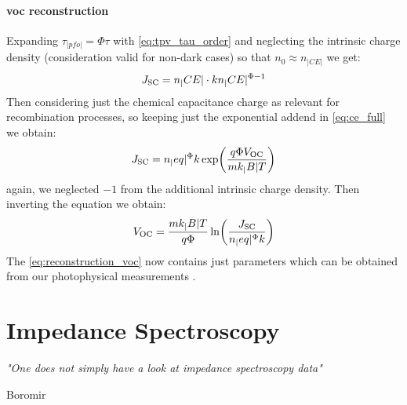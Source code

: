 	\paragraph{\Gls{voc} reconstruction}
	Expanding $\tau_|pfo| = \Phi \tau$ with \cref{eq:tpv_tau_order} and neglecting the intrinsic charge density (consideration valid for non-dark cases) so that $n_0 \approx n_|CE|$ we get:
	\begin{equation}
		J_\mathrm{SC} = n_|CE| \cdot k n_|CE|^{\Phi-1}
	\end{equation}
	Then considering just the chemical capacitance charge as relevant for recombination processes, so keeping just the exponential addend in \cref{eq:ce_full} we obtain:
	\begin{equation}
		J_\mathrm{SC} = n_|eq|^\Phi k \exp(\frac{q \Phi V_\mathrm{OC}}{m k_|B| T})
	\end{equation}
	again, we neglected $-1$ from the additional intrinsic charge density. Then inverting the equation we obtain:
	\begin{equation}\label{eq:reconstruction_voc}
		V_\mathrm{OC} = \frac{m k_|B| T}{q \Phi} \ln( \frac{J_\mathrm{SC}}{n_|eq|^\Phi k} )
	\end{equation}
	The \cref{eq:reconstruction_voc} now contains just parameters which can be obtained from our photophysical measurements \cite{Wheeler2015,Wheeler2017,Du2018,Barnes2011a}.

\section{Impedance Spectroscopy}\label{characterization_impedance}
	\epigraph{\textit{"One does not simply have a look at impedance spectroscopy data"}}{Boromir}

